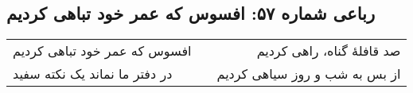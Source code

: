 \begin{center}
\section*{رباعی شماره ۵۷: افسوس که عمر خود تباهی کردیم}
\label{sec:057}
\begin{longtable}{l p{0.5cm} r}
افسوس که عمر خود تباهی کردیم
&&
صد قافلهٔ گناه، راهی کردیم
\\
در دفتر ما نماند یک نکته سفید
&&
از بس به شب و روز سیاهی کردیم
\\
\end{longtable}
\end{center}
